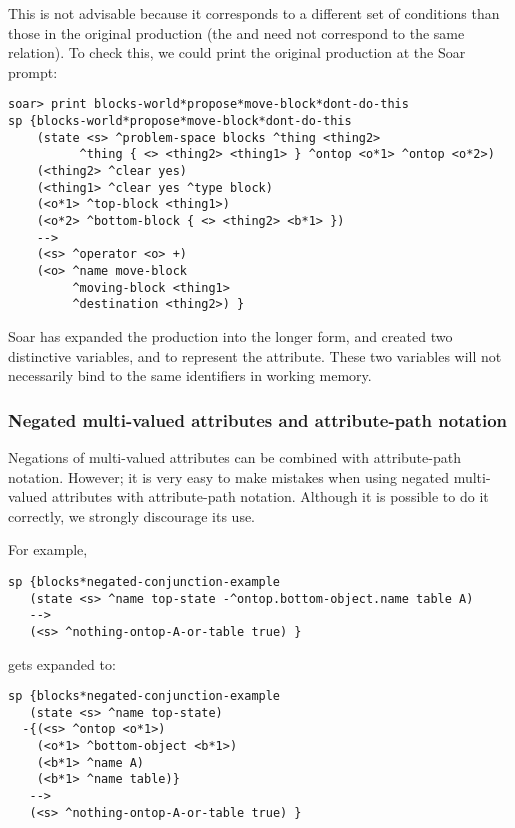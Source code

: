 This is not advisable because it corresponds to a different set of conditions than those in the original production (the  and  need not correspond to the same  relation). To check this, we could print the original production at the Soar prompt:

\begin{verbatim}
soar> print blocks-world*propose*move-block*dont-do-this
sp {blocks-world*propose*move-block*dont-do-this
    (state <s> ^problem-space blocks ^thing <thing2>
          ^thing { <> <thing2> <thing1> } ^ontop <o*1> ^ontop <o*2>)
    (<thing2> ^clear yes)
    (<thing1> ^clear yes ^type block)
    (<o*1> ^top-block <thing1>)
    (<o*2> ^bottom-block { <> <thing2> <b*1> })
    -->
    (<s> ^operator <o> +)
    (<o> ^name move-block 
         ^moving-block <thing1> 
         ^destination <thing2>) }
\end{verbatim}

Soar has expanded the production into the longer form, and created two distinctive variables,  and  to represent the  attribute. These two variables will not necessarily bind to the same identifiers in working memory.

\subsubsection*{Negated multi-valued attributes and attribute-path notation}

Negations of multi-valued attributes can be combined with attribute-path notation. However; it is very easy to make mistakes when using negated multi-valued attributes with attribute-path notation. Although it is possible to do it correctly, we strongly discourage its use.

For example, 

\begin{verbatim}
sp {blocks*negated-conjunction-example
   (state <s> ^name top-state -^ontop.bottom-object.name table A)
   -->
   (<s> ^nothing-ontop-A-or-table true) }
\end{verbatim}

gets expanded to:

\begin{verbatim}
sp {blocks*negated-conjunction-example
   (state <s> ^name top-state)
  -{(<s> ^ontop <o*1>)
    (<o*1> ^bottom-object <b*1>)
    (<b*1> ^name A)
    (<b*1> ^name table)}
   -->
   (<s> ^nothing-ontop-A-or-table true) }
\end{verbatim}

